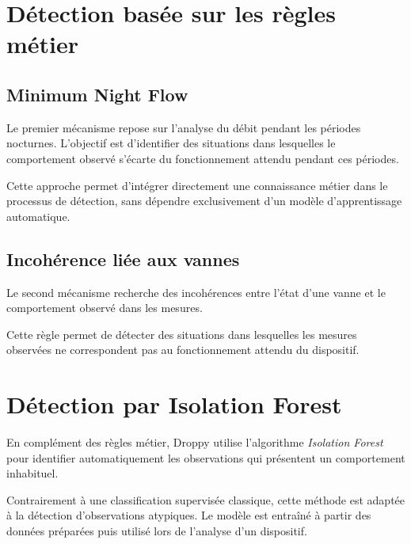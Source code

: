 
\section{Détection basée sur les règles métier}

\subsection{Minimum Night Flow}

Le premier mécanisme repose sur l'analyse du débit pendant les périodes
nocturnes. L'objectif est d'identifier des situations dans lesquelles le
comportement observé s'écarte du fonctionnement attendu pendant ces
périodes.

Cette approche permet d'intégrer directement une connaissance métier dans
le processus de détection, sans dépendre exclusivement d'un modèle
d'apprentissage automatique.

\subsection{Incohérence liée aux vannes}

Le second mécanisme recherche des incohérences entre l'état d'une vanne et
le comportement observé dans les mesures.

Cette règle permet de détecter des situations dans lesquelles les mesures
observées ne correspondent pas au fonctionnement attendu du dispositif.



\section{Détection par Isolation Forest}

En complément des règles métier, Droppy utilise l'algorithme
\textit{Isolation Forest} pour identifier automatiquement les observations
qui présentent un comportement inhabituel.

Contrairement à une classification supervisée classique, cette méthode est
adaptée à la détection d'observations atypiques. Le modèle est entraîné à
partir des données préparées puis utilisé lors de l'analyse d'un dispositif.

